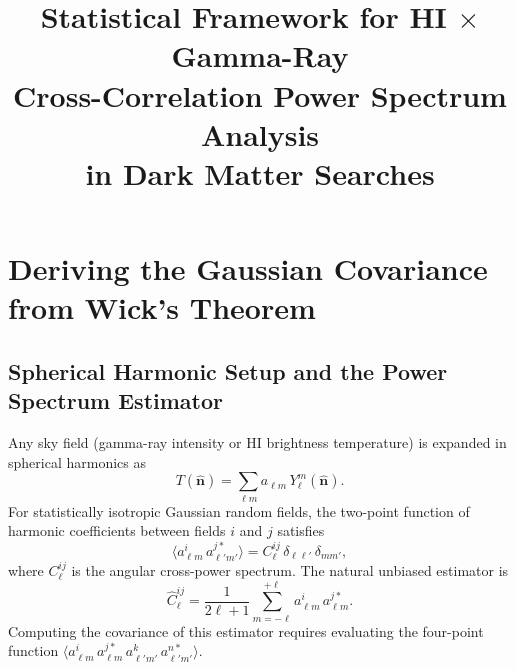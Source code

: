 \documentclass[10pt,a4paper]{article}
\title{Statistical Framework for HI $\times$ Gamma-Ray \\
Cross-Correlation Power Spectrum Analysis \\
in Dark Matter Searches}
\author{}
\date{}
\newcommand{\Cl}{C_\ell}
\newcommand{\mchi}{m_\chi}
\newcommand{\nhat}{\hat{\mathbf{n}}}
\begin{document}



\section{Deriving the Gaussian Covariance from Wick's Theorem}
\label{sec:covariance}

\subsection{Spherical Harmonic Setup and the Power Spectrum Estimator}

Any sky field (gamma-ray intensity or HI brightness temperature) is expanded in spherical harmonics as
\begin{equation}
T(\nhat) = \sum_{\ell m} a_{\ell m}\, Y_\ell^m(\nhat).
\end{equation}
For statistically isotropic Gaussian random fields, the two-point function of harmonic coefficients between fields $i$ and $j$ satisfies
\begin{equation}
\langle a_{\ell m}^i \, a_{\ell' m'}^{j*} \rangle = \Cl^{ij}\, \delta_{\ell\ell'}\, \delta_{mm'},
\end{equation}
where $\Cl^{ij}$ is the angular cross-power spectrum. The natural unbiased estimator is
\begin{equation}
\hat{C}_\ell^{ij} = \frac{1}{2\ell+1} \sum_{m=-\ell}^{+\ell} a_{\ell m}^i \, a_{\ell m}^{j*}.
\label{eq:cl_estimator}
\end{equation}
Computing the covariance of this estimator requires evaluating the four-point function
$\langle a_{\ell m}^i \, a_{\ell m}^{j*} \, a_{\ell' m'}^k \, a_{\ell' m'}^{n*} \rangle$.
\end{document}
